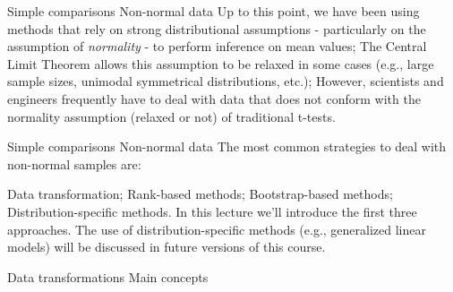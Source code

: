 \documentclass[t]{beamer}
\begin{document}

\begin{ftst}
{Simple comparisons}
{Non-normal data}
Up to this point, we have been using methods that rely on strong distributional assumptions - particularly on the assumption of \textit{normality} - to perform inference on mean values;
\vone
The Central Limit Theorem allows this assumption to be relaxed in some cases (e.g., large sample sizes, unimodal symmetrical distributions, etc.); 
\vone
However, scientists and engineers frequently have to deal with data that does not conform with the normality assumption (relaxed or not) of traditional t-tests.
\end{ftst}


\begin{ftst}
{Simple comparisons}
{Non-normal data}
The most common strategies to deal with non-normal samples are:

\bitems Data transformation;
\spitem Rank-based methods;
\spitem Bootstrap-based methods;
\spitem Distribution-specific methods.
\eitem
\vone
In this lecture we'll introduce the first three approaches. The use of distribution-specific methods (e.g., generalized linear models) will be discussed in future versions of this course.
\end{ftst}

\begin{ftst}
{Data transformations}
{Main concepts}

\end{ftst}
\end{document}
